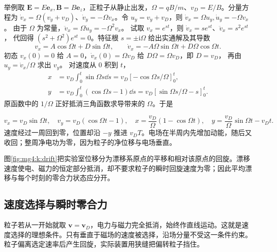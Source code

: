 举例取 $\bm E=E\bm e_x,\bm B=B\bm e_z$，正粒子从静止出发，$\Omega=qB/m$、$v_D=E/B$。分量方程为 $\dot v_x=\Omega(v_y+v_D)$、$\dot v_y=-\Omega v_x$。令 $u_y=v_y+v_D$，则 $\dot v_x=\Omega u_y,\dot u_y=-\Omega v_x$。
由于 $\Omega$ 为常量，$\ddot v_x=\Omega\dot u_y=-\Omega^2v_x$。
试取 $v_x=e^{st}$，则 $\dot v_x=se^{st}$、$\ddot v_x=s^2e^{st}$，
代回得 $(s^2+\Omega^2)e^{st}=0$。特征根 $s=\pm\mathrm i\Omega$ 给出实通解及其导数
\[
 v_x=A\cos\Omega t+D\sin\Omega t,\qquad
 \dot v_x=-A\Omega\sin\Omega t+D\Omega\cos\Omega t.
\]
初态 $v_x(0)=0$ 给 $A=0$，$\dot v_x(0)=\Omega v_D$ 给 $D\Omega=\Omega v_D$，即 $D=v_D$，
再由 $u_y=\dot v_x/\Omega$ 求出 $v_y$。
对速度从 $0$ 积到 $t$，
\[
 \begin{aligned}
 x&=v_D\int_0^t\sin\Omega s\dd s
   =v_D[-\cos\Omega s/\Omega]_0^t,\\
 y&=v_D\int_0^t(\cos\Omega s-1)\dd s
   =v_D[\sin\Omega s/\Omega-s]_0^t.
 \end{aligned}
\]
原函数中的 $1/\Omega$ 正好抵消三角函数求导带来的 $\Omega$。于是

\[
v_x=v_D\sin\Omega t,\quad v_y=v_D(\cos\Omega t-1),
\quad x=\frac{v_D}{\Omega}(1-\cos\Omega t),\quad
y=\frac{v_D}{\Omega}\sin\Omega t-v_Dt.
\]
速度经过一周回到零，位置却沿 $-y$ 推进 $v_DT$。电场在半周内先增加动能，随后又收回；整周净电功为零，因为粒子的净位移与电场垂直。


图\ref{fig:mg4:k:drift}把实验室位移分为漂移系原点的平移和相对该原点的回旋。漂移速度使电、磁力的恒定部分抵消，却不要求粒子的瞬时回旋速度为零；因此平均漂移与每个时刻的零合力状态应分开。


\subsection{速度选择与瞬时零合力}
粒子若从一开始就取 $\bm v=\bm v_D$，电力与磁力完全抵消，始终作直线运动。这就是速度选择的理想条件。只有垂直于磁场的速度被选择，沿场分量不受这一条件约束。粒子偏离选定速率后产生回旋，实际装置用狭缝把偏转粒子挡住。


